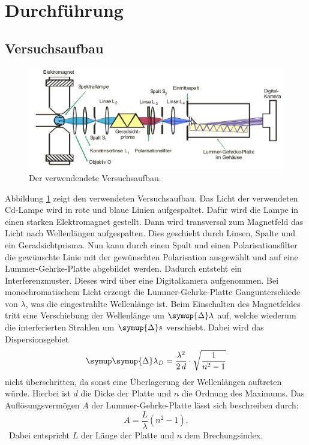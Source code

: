 \documentclass[
  bibliography=totoc,     %
  captions=tableheading,  %
  titlepage=firstiscover, %
]{scrartcl}
\begin{document}
\section{Durchführung}
\subsection{Versuchsaufbau}
\begin{figure}
  \centering
  \includegraphics[scale=0.39]{aufbau.png}
  \caption{Der verwendendete Versuchsaufbau.}
  \label{fig:3}
\end{figure}
\noindent
Abbildung \ref{fig:3} zeigt den verwendeten Versuchsaufbau. Das Licht der
verwendeten Cd-Lampe wird in rote und blaue Linien aufgespaltet. Dafür wird die
Lampe in einen starken Elektromagnet gestellt. Dann
wird transversal zum Magnetfeld das Licht nach Wellenlängen aufgespalten. Dies
geschieht durch Linsen, Spalte und ein Geradsichtprisma. Nun kann durch einen
Spalt und einen Polarisationsfilter die gewünschte Linie mit der gewünschten
Polarisation ausgewählt und auf eine Lummer-Gehrke-Platte abgebildet werden.
Dadurch entsteht ein Interferenzmuster. Dieses wird über eine Digitalkamera
aufgenommen. Bei monochromatischem Licht erzeugt die Lummer-Gehrke-Platte
Gangunterschiede von $\lambda$, was die eingestrahlte Wellenlänge ist. Beim
Einschalten des Magnetfeldes tritt eine Verschiebung der Wellenlänge um
$\symup{\Delta} \lambda$ auf, welche wiederum die interferierten Strahlen
um $\symup{\Delta} s$ verschiebt. Dabei wird das Dispersionsgebiet
\begin{equation}
    \symup \symup{\Delta} \lambda_D = \frac{\lambda^2}{2\, d} \cdot \sqrt{\frac{1}{n^2 - 1}}
    \label{eqn:11}
\end{equation}
nicht überschritten, da sonst eine Überlagerung der Wellenlängen auftreten würde.
Hierbei ist $d$ die Dicke der Platte und $n$ die Ordnung des Maximums. Das
Auflösungsvermögen $A$ der Lummer-Gehrke-Platte lässt sich beschreiben durch:
\begin{equation}
  A = \frac{L}{\lambda} (n^2 - 1).
  \label{eqn:12}
\end{equation}\
Dabei entspricht $L$ der Länge der Platte und $n$ dem Brechungsindex.
\end{document}
